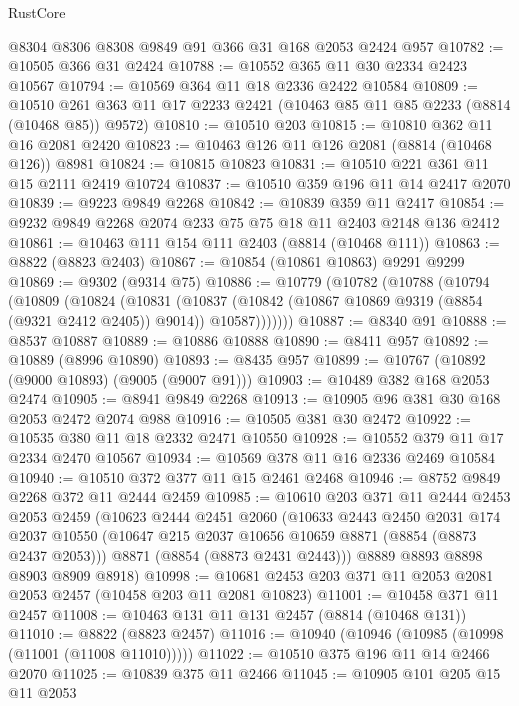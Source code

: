 \begin{lexlean}{RustCore}
\begin{coremodule}
    @8304
    @8306
    @8308
    @9849
    @91
    @366
    @31
    @168
    @2053
    @2424
    @957
@10782 := @10505 @366 @31 @2424
@10788 := @10552 @365 @11 @30 @2334 @2423 @10567
@10794 := @10569 @364 @11 @18 @2336 @2422 @10584
@10809 := @10510 @261 @363 @11 @17 @2233 @2421 (@10463 @85 @11 @85 @2233 (@8814 (@10468 @85)) @9572)
@10810 := @10510 @203
@10815 := @10810 @362 @11 @16 @2081 @2420
@10823 := @10463 @126 @11 @126 @2081 (@8814 (@10468 @126)) @8981
@10824 := @10815 @10823
@10831 := @10510 @221 @361 @11 @15 @2111 @2419 @10724
@10837 := @10510 @359 @196 @11 @14 @2417 @2070
@10839 := @9223 @9849 @2268
@10842 := @10839 @359 @11 @2417
@10854 := @9232 @9849 @2268 @2074 @233 @75 @75 @18 @11 @2403 @2148 @136 @2412
@10861 := @10463 @111 @154 @111 @2403 (@8814 (@10468 @111))
@10863 := @8822 (@8823 @2403)
@10867 := @10854 (@10861 @10863) @9291 @9299
@10869 := @9302 (@9314 @75)
@10886 := @10779
    (@10782
      (@10788
        (@10794
          (@10809
            (@10824
              (@10831
                (@10837
                  (@10842 (@10867 @10869 @9319 (@8854 (@9321 @2412 @2405)) @9014))
                  @10587)))))))
@10887 := @8340 @91
@10888 := @8537 @10887
@10889 := @10886 @10888
@10890 := @8411 @957
@10892 := @10889 (@8996 @10890)
@10893 := @8435 @957
@10899 := @10767 (@10892 (@9000 @10893) (@9005 (@9007 @91)))
@10903 := @10489 @382 @168 @2053 @2474
@10905 := @8941 @9849 @2268
@10913 := @10905 @96 @381 @30 @168 @2053 @2472 @2074 @988
@10916 := @10505 @381 @30 @2472
@10922 := @10535 @380 @11 @18 @2332 @2471 @10550
@10928 := @10552 @379 @11 @17 @2334 @2470 @10567
@10934 := @10569 @378 @11 @16 @2336 @2469 @10584
@10940 := @10510 @372 @377 @11 @15 @2461 @2468
@10946 := @8752 @9849 @2268 @372 @11 @2444 @2459
@10985 := @10610
    @203
    @371
    @11
    @2444
    @2453
    @2053
    @2459
    (@10623
      @2444
      @2451
      @2060
      (@10633
        @2443
        @2450
        @2031
        @174
        @2037
        @10550
        (@10647 @215 @2037 @10656 @10659 @8871 (@8854 (@8873 @2437 @2053)))
        @8871
        (@8854 (@8873 @2431 @2443)))
      @8889
      @8893
      @8898
      @8903
      @8909
      @8918)
@10998 := @10681 @2453 @203 @371 @11 @2053 @2081 @2053 @2457 (@10458 @203 @11 @2081 @10823)
@11001 := @10458 @371 @11 @2457
@11008 := @10463 @131 @11 @131 @2457 (@8814 (@10468 @131))
@11010 := @8822 (@8823 @2457)
@11016 := @10940 (@10946 (@10985 (@10998 (@11001 (@11008 @11010)))))
@11022 := @10510 @375 @196 @11 @14 @2466 @2070
@11025 := @10839 @375 @11 @2466
@11045 := @10905
    @101
    @205
    @15
    @11
    @2053

\end{coremodule}
\end{lexlean}

